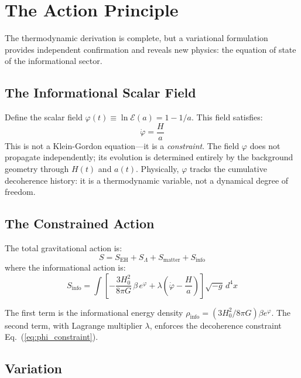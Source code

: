 \documentclass[aps,prd,twocolumn,superscriptaddress,nofootinbib]{revtex4-2}
\begin{document}
\section{The Action Principle}
\label{sec:action}

The thermodynamic derivation is complete, but a variational formulation provides independent confirmation and reveals new physics: the equation of state of the informational sector.

\subsection{The Informational Scalar Field}

Define the scalar field $\varphi(t) \equiv \ln\mathcal{E}(a) = 1 - 1/a$. This field satisfies:
\begin{equation}
\dot{\varphi} = \frac{H}{a}
\label{eq:phi_constraint}
\end{equation}
This is not a Klein-Gordon equation---it is a \textit{constraint}. The field $\varphi$ does not propagate independently; its evolution is determined entirely by the background geometry through $H(t)$ and $a(t)$. Physically, $\varphi$ tracks the cumulative decoherence history: it is a thermodynamic variable, not a dynamical degree of freedom.

\subsection{The Constrained Action}

The total gravitational action is:
\begin{equation}
S = S_\text{EH} + S_\Lambda + S_\text{matter} + S_\text{info}
\end{equation}
where the informational action is:
\begin{equation}
S_\text{info} = \int\left[-\frac{3H_0^2}{8\pi G}\,\beta\,e^{\varphi} + \lambda\left(\dot{\varphi} - \frac{H}{a}\right)\right]\sqrt{-g}\,d^4x
\label{eq:Sinfo}
\end{equation}

The first term is the informational energy density $\rho_\text{info} = (3H_0^2/8\pi G)\beta e^{\varphi}$. The second term, with Lagrange multiplier $\lambda$, enforces the decoherence constraint Eq.~(\ref{eq:phi_constraint}).

\subsection{Variation}
\end{document}
